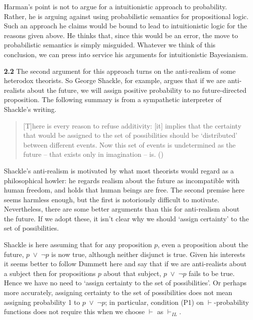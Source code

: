\documentclass[
  11pt,
  letterpaper,
  DIV=11,
  numbers=noendperiod,
  oneside]{scrartcl}
\begin{document}
Harman's point is not to argue for a intuitionistic approach to
probability. Rather, he is arguing against using probabilistic semantics
for propositional logic. Such an approach he claims would be bound to
lead to intuitionistic logic for the reasons given above. He thinks
that, since this would be an error, the move to probabilistic semantics
is simply misguided. Whatever we think of this conclusion, we can press
into service his arguments for intuitionistic Bayesianism.

\textbf{2.2} The second argument for this approach turns on the
anti-realism of some heterodox theorists. So George Shackle, for
example, argues that if we are anti-realists about the future, we will
assign positive probability to no future-directed proposition. The
following summary is from a sympathetic interpreter of Shackle's
writing.

\begin{quote}
{[}T{]}here is every reason to refuse additivity: {[}it{]} implies that
the certainty that would be assigned to the set of possibilities should
be `distributed' between different events. Now this set of events is
undetermined as the future -- that exists only in imagination -- is.
()
\end{quote}

Shackle's anti-realism is motivated by what most theorists would regard
as a philosophical howler: he regards realism about the future as
incompatible with human freedom, and holds that human beings are free.
The second premise here seems harmless enough, but the first is
notoriously difficult to motivate. Nevertheless, there are some better
arguments than this for anti-realism about the future. If we adopt
these, it isn't clear why we should `assign certainty' to the set of
possibilities.

Shackle is here assuming that for any proposition \(p\), even a
proposition about the future, \(p\)~\({\vee}\)~\({\lnot}\)\(p\) is now
true, although neither disjunct is true. Given his interests it seems
better to follow Dummett here and say that if we are anti-realists about
a subject then for propositions \(p\) about that subject,
\(p\)~\({\vee}\)~\({\lnot}\)\(p\) fails to be true. Hence we have no
need to `assign certainty to the set of possibilities'. Or perhaps more
accurately, assigning certainty to the set of possibilities does not
mean assigning probability 1 to \(p\)~\({\vee}\)~\({\lnot}\)\(p\); in
particular, condition (P1) on \(\vdash\)-probability functions does not
require this when we choose \(\vdash\) as \(\vdash_{IL}\).
\end{document}
